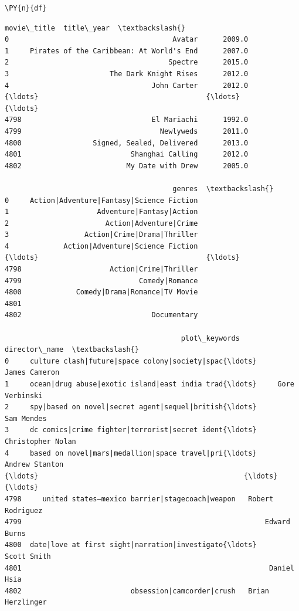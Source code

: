     \begin{tcolorbox}[breakable, size=fbox, boxrule=1pt, pad at break*=1mm,colback=cellbackground, colframe=cellborder]
\begin{Verbatim}[commandchars=\\\{\}]
\PY{n}{df}
\end{Verbatim}
\end{tcolorbox}

            \begin{tcolorbox}[breakable, boxrule=.5pt, size=fbox, pad at break*=1mm, opacityfill=0]
\begin{Verbatim}[commandchars=\\\{\}]
                                   movie\_title  title\_year  \textbackslash{}
0                                       Avatar      2009.0
1     Pirates of the Caribbean: At World's End      2007.0
2                                      Spectre      2015.0
3                        The Dark Knight Rises      2012.0
4                                  John Carter      2012.0
{\ldots}                                        {\ldots}         {\ldots}
4798                               El Mariachi      1992.0
4799                                 Newlyweds      2011.0
4800                 Signed, Sealed, Delivered      2013.0
4801                          Shanghai Calling      2012.0
4802                         My Date with Drew      2005.0

                                        genres  \textbackslash{}
0     Action|Adventure|Fantasy|Science Fiction
1                     Adventure|Fantasy|Action
2                       Action|Adventure|Crime
3                  Action|Crime|Drama|Thriller
4             Action|Adventure|Science Fiction
{\ldots}                                        {\ldots}
4798                     Action|Crime|Thriller
4799                            Comedy|Romance
4800             Comedy|Drama|Romance|TV Movie
4801
4802                               Documentary

                                          plot\_keywords      director\_name  \textbackslash{}
0     culture clash|future|space colony|society|spac{\ldots}      James Cameron
1     ocean|drug abuse|exotic island|east india trad{\ldots}     Gore Verbinski
2     spy|based on novel|secret agent|sequel|british{\ldots}         Sam Mendes
3     dc comics|crime fighter|terrorist|secret ident{\ldots}  Christopher Nolan
4     based on novel|mars|medallion|space travel|pri{\ldots}     Andrew Stanton
{\ldots}                                                 {\ldots}                {\ldots}
4798     united states–mexico barrier|stagecoach|weapon   Robert Rodriguez
4799                                                          Edward Burns
4800  date|love at first sight|narration|investigato{\ldots}        Scott Smith
4801                                                           Daniel Hsia
4802                          obsession|camcorder|crush   Brian Herzlinger


\end{Verbatim}
\end{tcolorbox}
